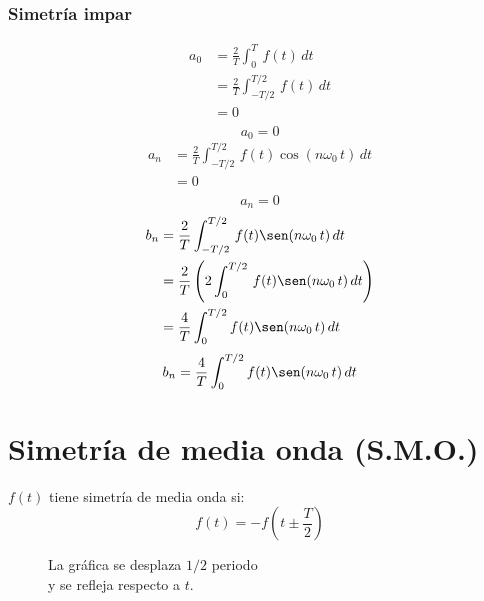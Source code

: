 \subsubsection{Simetría impar}
\begin{equation*}
\begin{split}
    a_0
        &=\frac{2}{T}\int_0^T\,f(t)\,dt\\
        &=\frac{2}{T}\int_{-T/2}^{T/2}\,f(t)\,dt\\
        &=0\\
\end{split}
\end{equation*}
\begin{equation}
    a_0=0
\end{equation}
\begin{equation*}
\begin{split}
    a_n
        &=\frac{2}{T}\int_{-T/2}^{T/2}\,f(t)\cos(n\omega_0\,t)\,dt\\
        &=0\\
\end{split}
\end{equation*}
\begin{equation}
    a_n=0
\end{equation}
\begin{equation*}
\begin{split}
    b_n
        &=\frac{2}{T}\int_{-T/2}^{T/2}\,f(t)\sen(n\omega_0\,t)\,dt\\
        &=\frac{2}{T}\left(2\int_0^{T/2}\,f(t)\sen(n\omega_0\,t)\,dt\right)\\
        &=\frac{4}{T}\int_0^{T/2}f(t)\sen(n\omega_0\,t)\,dt\\
\end{split}
\end{equation*}
\begin{equation}
    b_n=\frac{4}{T}\int_0^{T/2}f(t)\sen(n\omega_0\,t)\,dt
\end{equation}

\section{Simetría de media onda (S.M.O.)}
$f(t)$ tiene simetría de media onda si:
\begin{equation*}
    f(t)=-f(t\pm\frac{T}{2})
\end{equation*}
\begin{figure}[H]
    \centering
    
    \caption{La gráfica se desplaza $1/2$ periodo\\
    y se refleja respecto a $t$.}
\end{figure}

